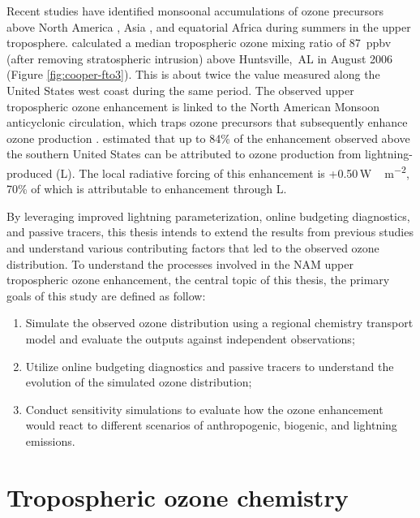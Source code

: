 Recent studies have identified monsoonal accumulations of ozone precursors above North America \citep[][and references therein]{Li:2005ss,Cooper:2009nx}, Asia \citep{Park:2007bh,Worden:2009ve}, and equatorial Africa \citep{Bouarar:2011ly} during summers in the upper troposphere. \citet{Cooper:2007cr} calculated a median tropospheric ozone mixing ratio of 87~\unit{ppbv} (after removing stratospheric intrusion) above Huntsville,~AL in August 2006 (Figure \ref{fig:cooper-fto3}). This is about twice the value measured along the United States west coast during the same period. The observed upper tropospheric ozone enhancement is linked to the North American Monsoon anticyclonic circulation, which traps ozone precursors that subsequently enhance ozone production \citep{Li:2005ss}. \citet{Cooper:2006dq} estimated that up to 84\% of the enhancement observed above the southern United States can be attributed to {\insitu} ozone production from lightning-produced  (L). The local radiative forcing of this enhancement is +0.50\,\unit{W\,m^{-2}}, 70\% of which is attributable to enhancement through L.

By leveraging improved lightning parameterization, online budgeting diagnostics, and passive tracers, this thesis intends to extend the results from previous studies and understand various contributing factors that led to the observed ozone distribution. To understand the processes involved in the NAM upper tropospheric ozone enhancement, the central topic of this thesis, the primary goals of this study are defined as follow:
\begin{enumerate}
\item{} Simulate the observed ozone distribution using a regional chemistry transport model and evaluate the outputs against independent observations;
\item{} Utilize online budgeting diagnostics and passive tracers to understand the evolution of the simulated ozone distribution;
\item{} Conduct sensitivity simulations to evaluate how the ozone enhancement would react to different scenarios of anthropogenic, biogenic, and lightning emissions.
\end{enumerate}

\newpage
\section{Tropospheric ozone chemistry} \label{sec:intro/ozone}

